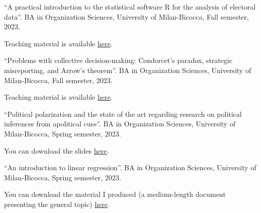 \documentclass[10pt,]{article}
\providecommand{\tightlist}{%
  \setlength{\itemsep}{0pt}\setlength{\parskip}{0pt}}
\renewenvironment{itemize}{
  \begin{list}{}{
    \setlength{\leftmargin}{1.5em}
  }
}{
  \end{list}
}
\begin{document}
\begin{enumerate}
\def\labelenumi{\arabic{enumi}.}
\setcounter{enumi}{3}
\tightlist
\item
  ``A practical introduction to the statistical software R for the
  analysis of electoral data''. BA in Organization Sciences, University
  of Milan-Bicocca, Fall semester, 2023.

  \begin{itemize}
  \tightlist
  \item
    Teaching material is available
    \href{https://github.com/gaetanoscaduto/teaching/tree/main/introduzioneR}{here}.
  \end{itemize}
\end{enumerate}

\begin{enumerate}
\def\labelenumi{\arabic{enumi}.}
\setcounter{enumi}{2}
\tightlist
\item
  ``Problems with collective decision-making: Condorcet's paradox,
  strategic misreporting, and Arrow's theorem''. BA in Organization
  Sciences, University of Milan-Bicocca, Fall semester, 2023.

  \begin{itemize}
  \tightlist
  \item
    Teaching material is available
    \href{https://github.com/gaetanoscaduto/teaching/tree/main/CondorcetPP}{here}.
  \end{itemize}
\end{enumerate}

\begin{enumerate}
\def\labelenumi{\arabic{enumi}.}
\setcounter{enumi}{1}
\tightlist
\item
  ``Political polarization and the state of the art regarding research
  on political inferences from apolitical cues''. BA in Organization
  Sciences, University of Milan-Bicocca, Spring semester, 2023.

  \begin{itemize}
  \tightlist
  \item
    You can download the slides
    \href{https://gaetanoscaduto.github.io/teaching_materials/Polarizzazione.pdf}{here}.
  \end{itemize}
\end{enumerate}

\begin{enumerate}
\def\labelenumi{\arabic{enumi}.}
\tightlist
\item
  ``An introduction to linear regression''. BA in Organization Sciences,
  University of Milan-Bicocca, Spring semester, 2023.

  \begin{itemize}
  \tightlist
  \item
    You can download the material I produced (a medium-length document
    presenting the general topic)
    \href{https://gaetanoscaduto.github.io/teaching_materials/Dispensa_regressione.pdf}{here}.
  \end{itemize}
\end{enumerate}
\end{document}
